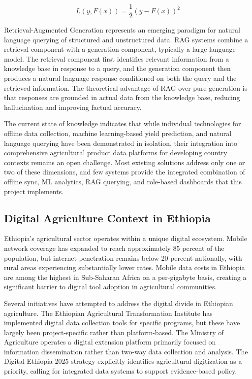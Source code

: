 \documentclass[12pt,a4paper,oneside]{report}
\begin{document}
\begin{equation}
L(y, F(x)) = \frac{1}{2}(y - F(x))^2
\end{equation}

Retrieval-Augmented Generation \cite{lewis2020} represents an emerging paradigm for natural language querying of structured and unstructured data. RAG systems combine a retrieval component with a generation component, typically a large language model. The retrieval component first identifies relevant information from a knowledge base in response to a query, and the generation component then produces a natural language response conditioned on both the query and the retrieved information. The theoretical advantage of RAG over pure generation is that responses are grounded in actual data from the knowledge base, reducing hallucination and improving factual accuracy.

The current state of knowledge indicates that while individual technologies for offline data collection, machine learning-based yield prediction, and natural language querying have been demonstrated in isolation, their integration into comprehensive agricultural product data platforms for developing country contexts remains an open challenge. Most existing solutions address only one or two of these dimensions, and few systems provide the integrated combination of offline sync, ML analytics, RAG querying, and role-based dashboards that this project implements.

\subsection{Digital Agriculture Context in Ethiopia}
Ethiopia's agricultural sector operates within a unique digital ecosystem. Mobile network coverage has expanded to reach approximately 85 percent of the population, but internet penetration remains below 20 percent nationally, with rural areas experiencing substantially lower rates. Mobile data costs in Ethiopia are among the highest in Sub-Saharan Africa on a per-gigabyte basis, creating a significant barrier to digital tool adoption in agricultural communities.

Several initiatives have attempted to address the digital divide in Ethiopian agriculture. The Ethiopian Agricultural Transformation Institute has implemented digital data collection tools for specific programs, but these have largely been project-specific rather than platform-based. The Ministry of Agriculture operates a digital extension platform primarily focused on information dissemination rather than two-way data collection and analysis. The Digital Ethiopia 2025 strategy \cite{digitalethiopia2025} explicitly identifies agricultural digitization as a priority, calling for integrated data systems to support evidence-based policy.
\end{document}
